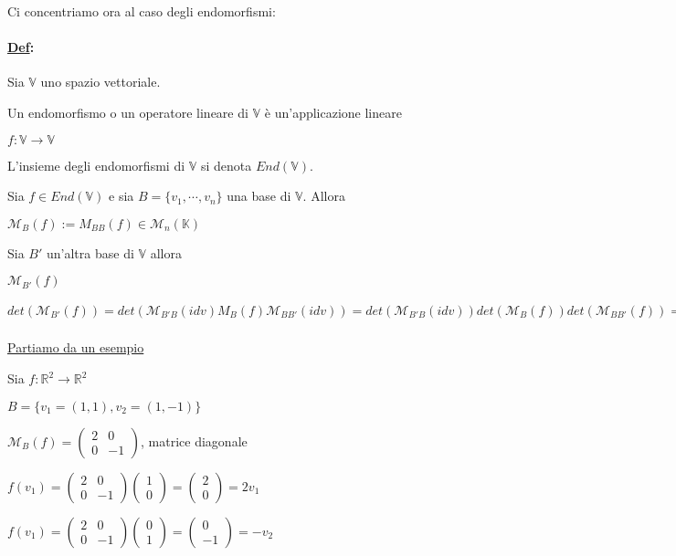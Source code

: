 \documentclass{article}
\newcommand{\hl}[1]{\colorbox{yellow}{#1}}
\newcommand{\ul}[1]{\underline{#1}}
\newcommand{\K}{\mathbb{K}}
\newcommand{\R}{\mathbb{R}}
\newcommand{\V}{\mathbb{V}}
\newcommand{\M}{\mathcal{M}}
\newcommand{\Def}[2]{\paragraph{\ul{Def}:}#1\\\hspace*{3em}\begin{minipage}{.8\textwidth}#2\end{minipage}}
\begin{document}
Ci concentriamo ora al caso degli endomorfismi:
\Def{Sia $\V$ uno spazio vettoriale.}{
	Un endomorfismo o un operatore lineare di $\V$ è un'applicazione lineare

	$f:\V\rightarrow\V$

	L'insieme degli endomorfismi di $\V$ si denota $End(\V)$.
}

Sia $f\in End(\V)$ e sia $B=\{v_1,\cdots,v_n\}$ una base di $\V$. Allora

$\M_B(f):=M_{BB}(f)\in\M_n(\K)$

Sia $B'$ un'altra base di $\V$ allora

$\M_{B'}(f)$


$det(\M_{B'}(f))=det(\M_{B'B}(idv)M_B(f)\M_{BB'}(idv))=det(\M_{B'B}(idv))det(\M_B(f))det(\M_{BB'}(f))=\frac{1}{\bar{det(\M_{BB'}(idv))}}\cdot det(\M_B(f))\cdot\bar{det(\M_{BB'}(idv))}$

\ul{Partiamo da un esempio}

Sia $f:\R^2\rightarrow\R^2$

$B=\{v_1=(1,1),v_2=(1,-1)\}$

$\M_B(f)=\begin{pmatrix}2&0\\0&-1\end{pmatrix}$, matrice diagonale

$f(v_1)=\begin{pmatrix}2&0\\0&-1\end{pmatrix}\begin{pmatrix}1\\0\end{pmatrix}=\begin{pmatrix}2\\0\end{pmatrix}=2v_1$

$f(v_1)=\begin{pmatrix}2&0\\0&-1\end{pmatrix}\begin{pmatrix}0\\1\end{pmatrix}=\begin{pmatrix}0\\-1\end{pmatrix}=-v_2$
\end{document}
